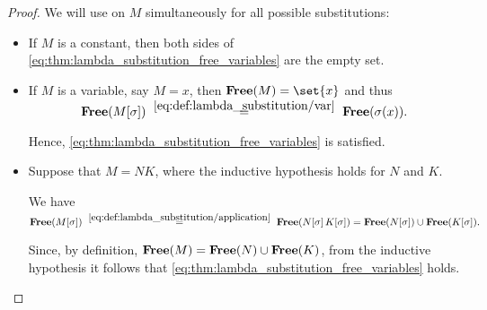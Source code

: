 \begin{proof}
  We will use  on \( M \) simultaneously for all possible substitutions:
  \begin{itemize}
    \item If \( M \) is a constant, then both sides of \eqref{eq:thm:lambda_substitution_free_variables} are the empty set.

    \item If \( M \) is a variable, say \( M = x \), then \( \op*{Free}(M) = \set{ x } \) and thus
    \begin{equation*}
      \op*{Free}(M[\sigma])
      \reloset {\eqref{eq:def:lambda_substitution/var}} =
      \op*{Free}(\sigma(x)).
    \end{equation*}

    Hence, \eqref{eq:thm:lambda_substitution_free_variables} is satisfied.

    \item Suppose that \( M = NK \), where the inductive hypothesis holds for \( N \) and \( K \).

    We have
    \begin{equation*}
      \op*{Free}(M[\sigma])
      \reloset {\eqref{eq:def:lambda_substitution/application}} =
      \op*{Free}(N[\sigma] \thinspace K[\sigma])
      =
      \op*{Free}(N[\sigma]) \cup \op*{Free}(K[\sigma]).
    \end{equation*}

    Since, by definition, \( \op*{Free}(M) = \op*{Free}(N) \cup \op*{Free}(K) \), from the inductive hypothesis it follows that \eqref{eq:thm:lambda_substitution_free_variables} holds.


\end{itemize}
\end{proof}
